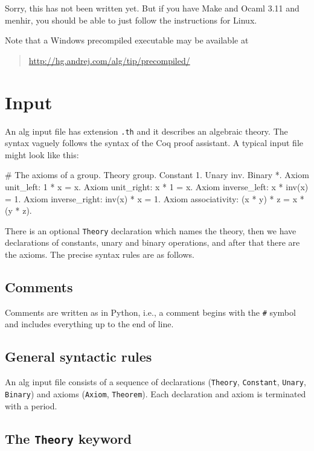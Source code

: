 \documentclass{article}
\begin{document}
Sorry, this has not been written yet. But if you have Make and Ocaml
3.11 and menhir, you should be able to just follow the instructions
for Linux.

Note that a Windows precompiled executable may be available at
%
\begin{quote}
  \url{http://hg.andrej.com/alg/tip/precompiled/}
\end{quote}

\section{Input}
\label{sec:input}

An alg input file has extension \texttt{.th} and it describes an
algebraic theory. The syntax vaguely follows the syntax of the Coq
proof assistant. A typical input file might look like this:
%
\begin{alg}
# The axioms of a group.
Theory group.
Constant 1.
Unary inv.
Binary *.
Axiom unit_left: 1 * x = x.
Axiom unit_right: x * 1 = x.
Axiom inverse_left: x * inv(x) = 1.
Axiom inverse_right: inv(x) * x = 1.
Axiom associativity: (x * y) * z = x * (y * z).
\end{alg}
%
There is an optional \texttt{Theory} declaration which names the
theory, then we have declarations of constants, unary and binary
operations, and after that there are the axioms. The precise
syntax rules are as follows.

\subsection{Comments}

Comments are written as in Python, i.e., a comment begins with the
\texttt{\#} symbol and includes everything up to the end of line.

\subsection{General syntactic rules}

An alg input file consists of a sequence of declarations
(\texttt{Theory}, \texttt{Constant}, \texttt{Unary}, \texttt{Binary})
and axioms (\texttt{Axiom}, \texttt{Theorem}). Each declaration and
axiom is terminated with a period.

\subsection{The \texttt{Theory} keyword}
\end{document}

